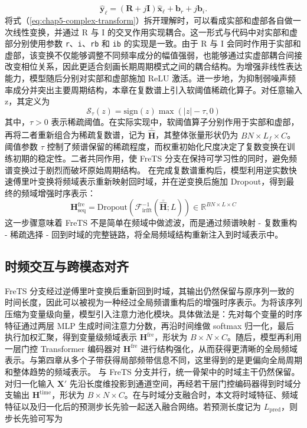 \begin{equation}
\widehat{\mathbf{y}}_\ell=(\mathbf{R}+j\mathbf{I})\widehat{\mathbf{x}}_\ell+\mathbf{b}_r+j\mathbf{b}_i.
\label{eq:chap5-complex-transform}
\end{equation}
将式（\ref{eq:chap5-complex-transform}）拆开理解时，可以看成实部和虚部各自做一次线性变换，并通过 R 与 I 的交叉作用实现耦合。这一形式与代码中对实部和虚部分别使用参数 \texttt{r}、\texttt{i}、\texttt{rb} 和 \texttt{ib} 的实现是一致。由于 R 与 I 会同时作用于实部和虚部，该变换不仅能够调整不同频率成分的幅值强弱，也能够通过实虚部耦合间接改变相位关系，因此更适合刻画长期周期模式之间的耦合结构。为增强非线性表达能力，模型随后分别对实部和虚部施加 ReLU 激活。进一步地，为抑制弱噪声频率成分并突出主要周期结构，本章在复数谱上引入软阈值稀疏化算子。对任意输入 z，其定义为
\begin{equation}
\mathcal{S}_{\tau}(z)=\mathrm{sign}(z)\max(|z|-\tau,0)
\label{eq:chap5-softshrink}
\end{equation}
其中，$\tau>0$ 表示稀疏阈值。在实际实现中，软阈值算子分别作用于实部和虚部，再将二者重新组合为稀疏复数谱，记为 $\bar{\widehat{\mathbf{H}}}$，其整体张量形状仍为 $BN\times L_f\times C$。阈值参数 $\tau$ 控制了频谱保留的稀疏程度，而权重初始化尺度决定了复数变换在训练初期的稳定性。二者共同作用，使 FreTS 分支在保持可学习性的同时，避免频谱变换过于剧烈而破坏原始周期结构。 在完成复数谱重构后，模型利用逆实数快速傅里叶变换将频域表示重新映射回时域，并在逆变换后施加 Dropout，得到最终的频域增强时序表示：
\begin{equation}
\mathbf{H}^{\mathrm{fre}}_{\mathrm{seq}}
=\mathrm{Dropout}\!\left(\mathcal{F}_{\mathrm{irfft}}^{-1}\!\left(\bar{\widehat{\mathbf{H}}};L\right)\right)
\in\mathbb{R}^{BN\times L\times C}
\label{eq:chap5-irfft}
\end{equation}
这一步骤意味着 FreTS 不是简单在频域中做滤波，而是通过频谱映射 - 复数重构 - 稀疏选择 - 回到时域的完整链路，将全局频域结构重新注入到时域表示中。 \subsection{时频交互与跨模态对齐} FreTS 分支经过逆傅里叶变换后重新回到时域，其输出仍然保留与原序列一致的时间长度，因此可以被视为一种经过全局频谱重构后的增强时序表示。为将该序列压缩为变量级向量，模型引入注意力池化模块。具体做法是：先对每个变量的时序特征通过两层 MLP 生成时间注意力分数，再沿时间维做 softmax 归一化，最后执行加权汇聚，得到变量级频域表示 $\mathbf{H}^{\mathrm{fre}}$，形状为 $B\times N\times C$。随后，模型再利用一层门控 Transformer 编码器对 $\mathbf{H}^{\mathrm{fre}}$ 进行结构强化，从而获得更清晰的全局频域表示。与第四章从多个子带获得局部频带信息不同，这里得到的是更偏向全局周期和整体趋势的频域表示。 与 FreTS 分支并行，统一骨架中的时域主干仍然保留。对归一化输入 $\mathbf{X}'$ 先沿长度维投影到通道空间，再经若干层门控编码器得到时域分支输出 $\mathbf{H}^{\mathrm{time}}$，形状为 $B\times N\times C$。在与时域分支融合时，本文将时域特征、频域特征以及归一化后的预测步长先验一起送入融合网络。若预测长度记为 $L_{\mathrm{pred}}$，则步长先验可写为
